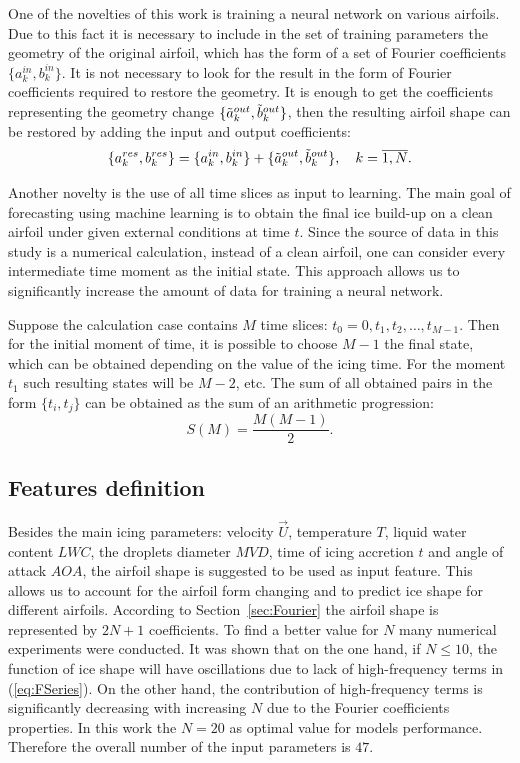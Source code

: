 \documentclass[aerospace,article,submit,moreauthors,pdftex]{Definitions/mdpi}
\begin{document}
One of the novelties of this work is training a neural network on various airfoils. Due to this fact it is necessary to include in the set of training parameters the geometry of the original airfoil, which has the form of a set of Fourier coefficients $ \{a_k^{in}, b_k^{in} \} $. It is not necessary to look for the result in the form of Fourier coefficients required to restore the geometry. It is enough to get the coefficients representing the geometry change $ \{\Tilde {a}_k^{out}, \Tilde {b}_k^{out} \} $, then the resulting airfoil shape can be restored by adding the input and output coefficients:
\begin{equation}
\label{eq:coeffsOut}
    \{a_k^{res},b_k^{res}\} = \{a_k^{in},b_k^{in}\} + \{\Tilde{a}_k^{out},\Tilde{b}_k^{out}\}, \quad k = \overline{1,N}.
\end{equation}

Another novelty is the use of all time slices as input to learning. The main goal of forecasting using machine learning is to obtain the final ice build-up on a clean airfoil under given external conditions at time $ t $. Since the source of data in this study is a numerical calculation, instead of a clean airfoil, one can consider every intermediate time moment as the initial state. This approach allows us to significantly increase the amount of data for training a neural network.

Suppose the calculation case contains $ M $ time slices: $ t_0 = 0, t_1, t_2, \dots, t_{M-1} $. Then for the initial moment of time, it is possible to choose $M -1$ the final state, which can be obtained depending on the value of the icing time. For the moment $t_1$ such resulting states will be $ M - 2 $, etc. The sum of all obtained pairs in the form $ \{t_i, t_j \} $ can be obtained as the sum of an arithmetic progression:
\begin{equation}
    \label{eq:pairsnum}
    S(M) = \frac{M (M - 1)}{2}. 
\end{equation}

\subsection{Features definition}

Besides the main icing parameters: velocity $\vec U$, temperature $T$, liquid water content $LWC$, the droplets diameter $MVD$, time of icing accretion $t$ and angle of attack $AOA$, the airfoil shape is suggested to be used as input feature. This allows us to account for the airfoil form changing and to predict ice shape for different airfoils. According to Section~\ref{sec:Fourier} the airfoil shape is represented by $2N + 1$ coefficients. To find a better value for $N$ many numerical experiments were conducted. It was shown that on the one hand, if $N \leq 10$, the function of ice shape will have oscillations due to lack of high-frequency terms in (\ref{eq:FSeries}). On the other hand, the contribution of high-frequency terms is significantly decreasing with increasing $N$ due to the Fourier coefficients properties. In this work the $N = 20$ as optimal value for models performance. Therefore the overall number of the input parameters is $47$.
\end{document}
